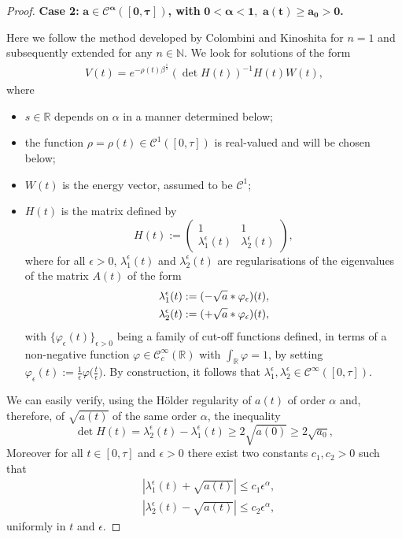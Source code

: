 \documentclass[12pt,oneside,a4paper]{book}
\numberwithin{equation}{section}     %
\theoremstyle{plain}
\theoremstyle{definition}
\newcommand{\R}{{\mathbb R}}
\begin{document}
\begin{proof}
	\textbf{Case 2:} $\bm{a\in\mathcal C^\alpha([0,\tau])}$\textbf{, with}  $\bm{ 0<\alpha<1,\,\,a(t)\geq a_0>0}$\textbf{.}
	
	Here we follow the method developed by Colombini and Kinoshita \cite{CK2002} for $n=1$ and subsequently extended \cite{GR2012} for any $n\in\mathbb N$. We look for solutions of the form 
	\begin{align}\label{sol}
	V(t)=e^{-\rho(t)\beta^{\frac{1}{s}}}(\det H(t))^{-1}H(t)W(t),
	\end{align}
	where
	\begin{itemize}
		\item $s\in\R$  depends on $\alpha$ in a manner determined below;
		\item the function $\rho=\rho(t)\in\mathcal C^1([0,\tau])$ is real-valued and will be chosen below;
		\item $W(t)$ is the energy vector, assumed to be $\mathcal{C}^1$;
		\item $H(t)$ is the matrix defined by
		\[
		H(t):=\begin{pmatrix}1 & 1\\ \lambda^\epsilon_1(t) & \lambda^\epsilon_2(t)\end{pmatrix},
		\]
		where for all $\epsilon>0$, $\lambda^\epsilon_1(t)$ and $\lambda^\epsilon_2(t)$ are regularisations of the eigenvalues of the matrix $A(t)$ of the form
		\begin{align*}
		&\lambda^\epsilon_{1}(t):=(-\sqrt{a}*\varphi_\epsilon)(t),\\\notag
		&\lambda^\epsilon_{2}(t):=(+\sqrt{a}*\varphi_\epsilon)(t),
		\end{align*}
		with $\{\varphi_\epsilon(t)\}_{\epsilon>0}$ being a family of cut-off functions defined, in terms of a non-negative function $\varphi\in\mathcal C^\infty_c(\R)$ with $\int_\R\varphi=1$, by setting $\varphi_\epsilon(t):=\frac{1}{\epsilon}\varphi\big(\frac{t}{\epsilon}\big)$. By construction, it follows that $\lambda^\epsilon_{1},\lambda^\epsilon_{2}\in\mathcal C^\infty([0,\tau])$.
		
		
	\end{itemize}
	We can easily verify, using the H\"older regularity of $a(t)$ of order $\alpha$ and, therefore, of $\sqrt{a(t)}$ of the same order $\alpha$, the  inequality
	\begin{equation}\label{strait}
	\det H(t)=\lambda^\epsilon_2(t)-\lambda^\epsilon_1(t)\geq 2\sqrt{a(0)}\geq 2\sqrt{a_0},
	\end{equation}
	Moreover for all $t\in[0,\tau]$ and $\epsilon>0$ there exist two constants $c_1,c_2>0$ such that
	\begin{align}
	&|\lambda^\epsilon_1(t)+\sqrt{a(t)}|\leq c_1\epsilon^\alpha,\\
	&|\lambda^\epsilon_2(t)-\sqrt{a(t)}|\leq c_2 \epsilon^\alpha,\label{difference}
	\end{align}
	uniformly in $t$ and $\epsilon$.
	

\end{proof}
\end{document}
